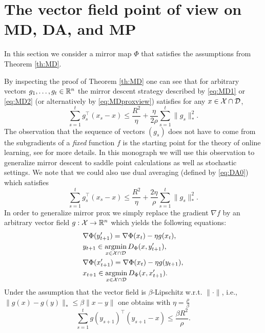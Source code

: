 \section{The vector field point of view on MD, DA, and MP} \label{sec:vectorfield}
In this section we consider a mirror map $\Phi$ that satisfies the assumptions from Theorem \ref{th:MD}.

By inspecting the proof of Theorem \ref{th:MD} one can see that for arbitrary vectors $g_1, \hdots, g_t \in \mathbb{R}^n$ the mirror descent strategy described by \eqref{eq:MD1} or \eqref{eq:MD2} (or alternatively by \eqref{eq:MDproxview}) satisfies for any $x \in \mathcal{X} \cap \mathcal{D}$,
\begin{equation} \label{eq:vfMD}
\sum_{s=1}^t g_s^{\top} (x_s - x) \leq \frac{R^2}{\eta} + \frac{\eta}{2 \rho} \sum_{s=1}^t \|g_s\|_*^2 .
\end{equation}
The observation that the sequence of vectors $(g_s)$ does not have to come from the subgradients of a {\em fixed} function $f$ is the starting point for the theory of online learning, see \cite{Bub11} for more details. In this monograph we will use this observation to generalize mirror descent to saddle point calculations as well as stochastic settings. We note that we could also use dual averaging (defined by \eqref{eq:DA0}) which satisfies
$$\sum_{s=1}^t g_s^{\top} (x_s - x) \leq \frac{R^2}{\eta} + \frac{2 \eta}{\rho} \sum_{s=1}^t \|g_s\|_*^2 .$$
In order to generalize mirror prox we simply replace the gradient $\nabla f$ by an arbitrary vector field $g: \mathcal{X} \rightarrow \mathbb{R}^n$ which yields the following equations:
\begin{align*}
& \nabla \Phi(y_{t+1}') = \nabla \Phi(x_{t}) - \eta g(x_t), \\
& y_{t+1} \in \mathop{\mathrm{argmin}}_{x \in \mathcal{X} \cap \mathcal{D}} D_{\Phi}(x,y_{t+1}') , \\ 
& \nabla \Phi(x_{t+1}') = \nabla \Phi(x_{t}) - \eta g(y_{t+1}), \\
& x_{t+1} \in \mathop{\mathrm{argmin}}_{x \in \mathcal{X} \cap \mathcal{D}} D_{\Phi}(x,x_{t+1}') .
\end{align*}
Under the assumption that the vector field is $\beta$-Lipschitz w.r.t. $\|\cdot\|$, i.e., $\|g(x) - g(y)\|_* \leq \beta \|x-y\|$ one obtains with $\eta = \frac{\rho}{\beta}$
\begin{equation} \label{eq:vfMP}
\sum_{s=1}^t g(y_{s+1})^{\top}(y_{s+1} - x) \leq \frac{\beta R^2}{\rho}.
\end{equation}